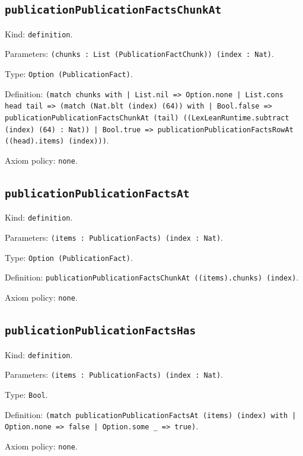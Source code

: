 \documentclass[11pt]{article}
\begin{document}
\subsection*{\texttt{publicationPublicationFactsChunkAt}}
\noindent Kind: \texttt{definition}.\par
\noindent Parameters: \texttt{(chunks : List (PublicationFactChunk)) (index : Nat)}.\par
\noindent Type: \texttt{Option (PublicationFact)}.\par
\noindent Definition: \texttt{(match chunks with | List.nil => Option.none | List.cons head tail => (match (Nat.blt (index) (64)) with | Bool.false => publicationPublicationFactsChunkAt (tail) ((LexLeanRuntime.subtract (index) (64) : Nat)) | Bool.true => publicationPublicationFactsRowAt ((head).items) (index)))}.\par
\noindent Axiom policy: \texttt{none}.\par
\subsection*{\texttt{publicationPublicationFactsAt}}
\noindent Kind: \texttt{definition}.\par
\noindent Parameters: \texttt{(items : PublicationFacts) (index : Nat)}.\par
\noindent Type: \texttt{Option (PublicationFact)}.\par
\noindent Definition: \texttt{publicationPublicationFactsChunkAt ((items).chunks) (index)}.\par
\noindent Axiom policy: \texttt{none}.\par
\subsection*{\texttt{publicationPublicationFactsHas}}
\noindent Kind: \texttt{definition}.\par
\noindent Parameters: \texttt{(items : PublicationFacts) (index : Nat)}.\par
\noindent Type: \texttt{Bool}.\par
\noindent Definition: \texttt{(match publicationPublicationFactsAt (items) (index) with | Option.none => false | Option.some \_ => true)}.\par
\noindent Axiom policy: \texttt{none}.\par
\end{document}
